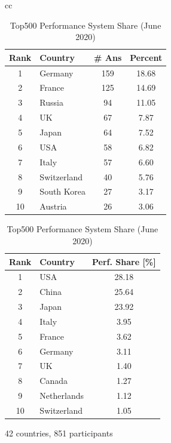 \documentclass[sigconf,nonacm]{acmart}
\begin{document}
\begin{table}[htb]%
\scriptsize
\begin{center}%
\begin{tabular}[t]{cc}

\begin{minipage}[t]{0.5\hsize}
\begin{center}%
\caption{\small Top 10 Countries of Participants}
\label{tab:countries}%
\begin{tabular}{c|l|c|c}%
\hline%
Rank & Country & \# Ans & Percent \\%
\hline%
1 & Germany 	& 159 & 18.68 \\%
2 & France 	& 125 & 14.69 \\%
3 & Russia 	& 94  & 11.05 \\%
4 & UK 		& 67  &  7.87 \\%
5 & Japan 	& 64  &  7.52 \\%
6 & USA 	& 58  &  6.82 \\%
7 & Italy 	& 57  &  6.60 \\%
\hline
8 & Switzerland & 40  &  5.76 \\%
9 & South Korea & 27  &  3.17 \\%
10 & Austria 	& 26  &  3.06 \\%
\hline%
\end{tabular}%
\end{center}%
\end{minipage}

\hspace{1mm}

\begin{minipage}[t]{0.5\hsize}
\begin{center}%
\caption{\small Top500 Performance System Share (June 2020)\cite{Top500}}
\label{tab:top500-share}%
\begin{tabular}{c|l|c}%
\hline%
Rank & Country & Perf. Share [\%] \\%
\hline%
1  & USA 	  & 28.18 \\%
2  & China 	  & 25.64 \\%
3  & Japan 	  & 23.92 \\%
4  & Italy	  & 3.95  \\%
5  & France	  & 3.62  \\%
6  & Germany 	  & 3.11  \\%
7  & UK		  & 1.40  \\%
8  & Canada	  & 1.27  \\%
9  & Netherlands  & 1.12  \\%
10  & Switzerland  & 1.05  \\%
\hline%
\end{tabular}%
\end{center}%
\end{minipage}%

\end{tabular}%
\end{center}%
42 countries, 851 participants\\%
\end{table}%
\end{document}
